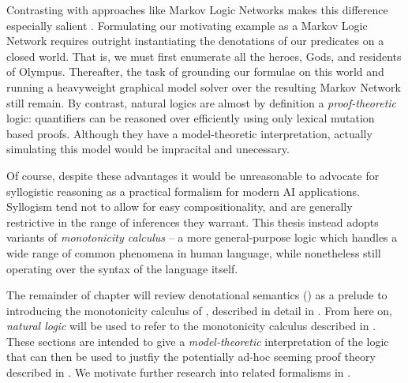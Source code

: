 Contrasting with approaches like Markov Logic Networks makes this difference especially salient
  \cite{key:2006richardson-mln}.
Formulating our motivating example as a Markov Logic Network requires outright instantiating
  the denotations of our predicates on a closed world.
That is, we must first enumerate all the heroes, Gods, and residents of Olympus.
Thereafter, the task of grounding our formulae on this world and running a heavyweight
  graphical model solver over the resulting Markov Network still remain.
By contrast, natural logics are almost by definition a \textit{proof-theoretic} logic:
  quantifiers can be reasoned over efficiently using only lexical mutation based proofs.
Although they have a model-theoretic interpretation, actually simulating this model
  would be impracital and unecessary.


Of course, despite these advantages it would be unreasonable to advocate for syllogistic
  reasoning as a practical formalism for modern AI applications.
Syllogism tend not to allow for easy compositionality, and are generally restrictive in
  the range of inferences they warrant.
This thesis instead adopts variants of \textit{monotonicity calculus}
  \cite{key:1986benthem-natlog,key:1991valencia-natlog}
  -- a more general-purpose logic which handles a wide range of common phenomena in human
  language, while nonetheless still operating over the syntax of the language itself.


%
%
The remainder of chapter will review denotational semantics ()
  as a prelude to introducing the monotonicity calculus of ,
  described in detail in .
From here on, \textit{natural logic} will be used to refer to the monotonicity calculus
  described in .
These sections are intended to give a \textit{model-theoretic} interpretation of the logic
  that can then be used to justfiy the potentially ad-hoc seeming proof theory described
  in .
We motivate further research into related formalisms in .
